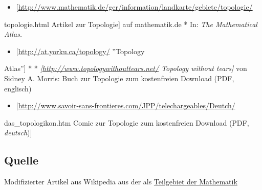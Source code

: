 \documentclass[12pt,]{article}
\providecommand{\tightlist}{%
  \setlength{\itemsep}{0pt}\setlength{\parskip}{0pt}}
\begin{document}
\begin{itemize}
\tightlist
\item
  {[}\url{http://www.mathematik.de/ger/information/landkarte/gebiete/topologie/}
\end{itemize}

topologie.html Artikel zur Topologie{]} auf mathematik.de * In:
\emph{The Mathematical Atlas.}

\begin{itemize}
\tightlist
\item
  {[}\url{http://at.yorku.ca/topology/} ''Topology
\end{itemize}

Atlas''{]} * * \emph{{[}\url{http://www.topologywithouttears.net/}
Topology without tears{]}} von Sidney A. Morris: Buch zur Topologie zum
kostenfreien Download (PDF, englisch)

\begin{itemize}
\tightlist
\item
  {[}\url{http://www.savoir-sans-frontieres.com/JPP/telechargeables/Deutch/}
\end{itemize}

das\_topologikon.htm Comic zur Topologie zum kostenfreien Download (PDF,
\emph{deutsch}){]}

\subsection{Quelle}\label{quelle}

Modifizierter Artikel aus Wikipedia aus der \href{Kategorie:Topologie}{
} als \href{Teilgebiet_der_Mathematik}{Teilgebiet der Mathematik}

\hypertarget{refs}{}
\end{document}
